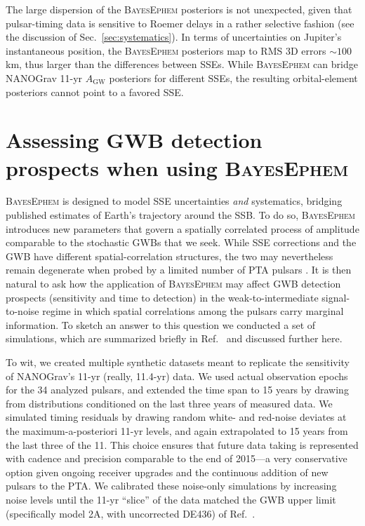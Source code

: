 \documentclass[reprint,
 amsmath,amssymb,
 aps,prd,floatfix,
]{revtex4-1}
\begin{document}
The large dispersion of the \textsc{BayesEphem} posteriors is not unexpected, given that pulsar-timing data is sensitive to Roemer delays in a rather selective fashion (see the discussion of Sec.\ \ref{sec:systematics}).
In terms of uncertainties on Jupiter's instantaneous position, the \textsc{BayesEphem} posteriors map to RMS 3D errors $\sim 100$ km, thus larger than the differences between SSEs. While \textsc{BayesEphem} can bridge NANOGrav 11-yr $A_\mathrm{GW}$ posteriors for different SSEs, the resulting orbital-element posteriors cannot point to a favored SSE.

\section{Assessing GWB detection prospects when using \textsc{BayesEphem}}
\label{sec:simulations}

\textsc{BayesEphem} is designed to model SSE uncertainties \emph{and} systematics, bridging published estimates of Earth's trajectory around the SSB.
To do so, \textsc{BayesEphem} introduces new parameters that govern a spatially correlated process of amplitude comparable to the stochastic GWBs that we seek.
While SSE corrections and the GWB have different spatial-correlation structures, the two may nevertheless remain degenerate when probed by a limited number of PTA pulsars \cite{2019ApJ...876...55R}.
It is then natural to ask how the application of \textsc{BayesEphem} may affect GWB detection prospects (sensitivity and time to detection) in the weak-to-intermediate signal-to-noise regime in which spatial correlations among the pulsars carry marginal information.
To sketch an answer to this question we conducted a set of simulations, which are summarized briefly in Ref.\ \cite{2018ApJ...859...47A} and discussed further here.

To wit, we created multiple synthetic datasets meant to replicate the sensitivity of NANOGrav's 11-yr (really, 11.4-yr) data. We used actual observation epochs for the 34 analyzed pulsars, and extended the time span to 15 years by drawing from distributions conditioned on the last three years of measured data.
We simulated timing residuals by drawing random white- and red-noise deviates at the maximum-a-posteriori 11-yr levels, and again extrapolated to 15 years from the last three of the 11.
This choice ensures that future data taking is represented with cadence and precision comparable to the end of 2015---a very conservative option given ongoing receiver upgrades and the continuous addition of new pulsars to the PTA.
We calibrated these noise-only simulations by increasing noise levels until the 11-yr ``slice'' of the data matched the GWB upper limit (specifically model 2A, with uncorrected DE436) of Ref.\ \cite{2018ApJ...859...47A}.
\end{document}
